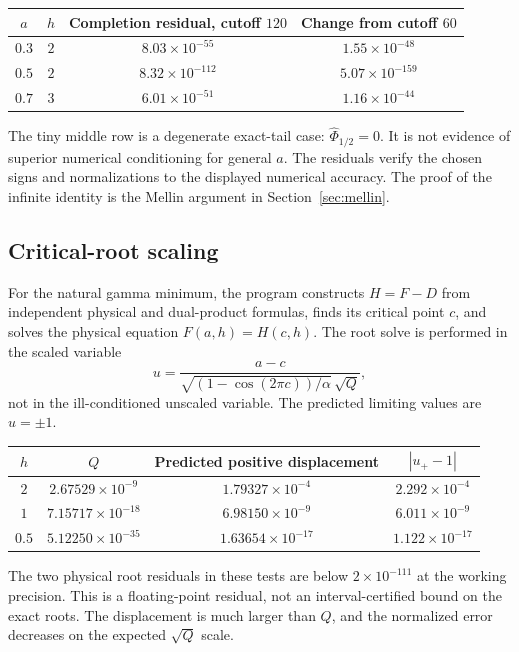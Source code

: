 \documentclass[11pt,a4paper]{article}
\numberwithin{equation}{section}
\theoremstyle{definition}
\theoremstyle{remark}\newtheorem{remark}[theorem]{Remark}
\begin{document}
\begin{center}
\begin{tabular}{@{}cccc@{}}
\toprule
$a$ & $h$ & Completion residual, cutoff $120$ & Change from cutoff $60$\\
\midrule
$0.3$ & $2$ & $8.03\times10^{-55}$ & $1.55\times10^{-48}$\\
$0.5$ & $2$ & $8.32\times10^{-112}$ & $5.07\times10^{-159}$\\
$0.7$ & $3$ & $6.01\times10^{-51}$ & $1.16\times10^{-44}$\\
\bottomrule
\end{tabular}
\end{center}
The tiny middle row is a degenerate exact-tail case:
$\widehat\Phi_{1/2}=0$. It is not evidence of superior numerical
conditioning for general $a$. The residuals verify the chosen signs and
normalizations to the displayed numerical accuracy. The proof of the
infinite identity is the Mellin argument in Section~\ref{sec:mellin}.

\subsection{Critical-root scaling}
For the natural gamma minimum, the program constructs $H=F-D$ from
independent physical and dual-product formulas, finds its critical point
$c$, and solves the physical equation $F(a,h)=H(c,h)$. The root solve
is performed in the scaled variable
\[
 u=\frac{a-c}{\sqrt{(1-\cos(2\pi c))/\alpha}\,\sqrt Q},
\]
not in the ill-conditioned unscaled variable. The predicted limiting
values are $u=\pm1$.

\begin{center}
\begin{tabular}{@{}cccc@{}}
\toprule
$h$ & $Q$ & Predicted positive displacement & $|u_+-1|$\\
\midrule
$2$ & $2.67529\times10^{-9}$ & $1.79327\times10^{-4}$ & $2.292\times10^{-4}$\\
$1$ & $7.15717\times10^{-18}$ & $6.98150\times10^{-9}$ & $6.011\times10^{-9}$\\
$0.5$ & $5.12250\times10^{-35}$ & $1.63654\times10^{-17}$ & $1.122\times10^{-17}$\\
\bottomrule
\end{tabular}
\end{center}
The two physical root residuals in these tests are below
$2\times10^{-111}$ at the working precision. This is a floating-point
residual, not an interval-certified bound on the exact roots.
The displacement is much larger than $Q$, and the normalized error
decreases on the expected $\sqrt Q$ scale.
\end{document}
